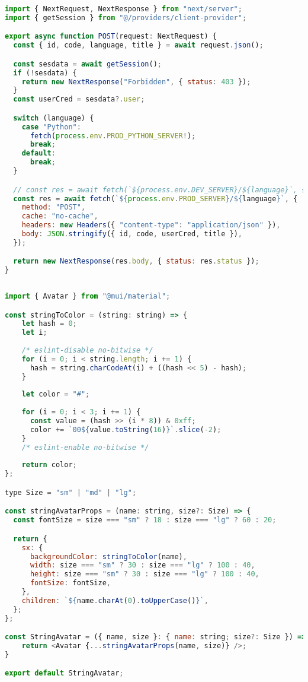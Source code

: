 \begin{lstlisting}[language=JavaScript, frame=single, caption={Бодолт явуулах NEXTjs endpoint}]
import { NextRequest, NextResponse } from "next/server";
import { getSession } from "@/providers/client-provider";

export async function POST(request: NextRequest) {
  const { id, code, language, title } = await request.json();

  const sesdata = await getSession();
  if (!sesdata) {
    return new NextResponse("Forbidden", { status: 403 });
  }
  const userCred = sesdata?.user;

  switch (language) {
    case "Python":
      fetch(process.env.PROD_PYTHON_SERVER!);
      break;
    default:
      break;
  }

  // const res = await fetch(`${process.env.DEV_SERVER}/${language}`, {
  const res = await fetch(`${process.env.PROD_SERVER}/${language}`, {
    method: "POST",
    cache: "no-cache",
    headers: new Headers({ "content-type": "application/json" }),
    body: JSON.stringify({ id, code, userCred, title }),
  });

  return new NextResponse(res.body, { status: res.status });
}
    
\end{lstlisting}

\begin{lstlisting}[language=JavaScript, frame=single, caption={Хэрэглэгчийн нэрнээс Avatar үүсгэж буй байдал}]
import { Avatar } from "@mui/material";

const stringToColor = (string: string) => {
    let hash = 0;
    let i;
  
    /* eslint-disable no-bitwise */
    for (i = 0; i < string.length; i += 1) {
      hash = string.charCodeAt(i) + ((hash << 5) - hash);
    }
  
    let color = "#";
  
    for (i = 0; i < 3; i += 1) {
      const value = (hash >> (i * 8)) & 0xff;
      color += `00${value.toString(16)}`.slice(-2);
    }
    /* eslint-enable no-bitwise */
  
    return color;
};

type Size = "sm" | "md" | "lg";

const stringAvatarProps = (name: string, size?: Size) => {
  const fontSize = size === "sm" ? 18 : size === "lg" ? 60 : 20;

  return {
    sx: {
      backgroundColor: stringToColor(name),
      width: size === "sm" ? 30 : size === "lg" ? 100 : 40,
      height: size === "sm" ? 30 : size === "lg" ? 100 : 40,
      fontSize: fontSize,
    },
    children: `${name.charAt(0).toUpperCase()}`,
  };
};

const StringAvatar = ({ name, size }: { name: string; size?: Size }) => {
    return <Avatar {...stringAvatarProps(name, size)} />;
}

export default StringAvatar;
\end{lstlisting}


